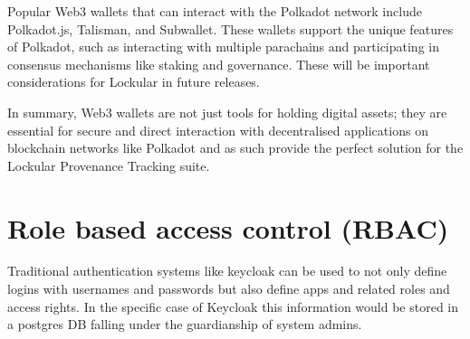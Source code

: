 \documentclass{tufte-handout}
\begin{document}
 Popular Web3 wallets that can interact with the Polkadot network include Polkadot.js, Talisman, and Subwallet. These wallets support the unique features of Polkadot, such as
 interacting with multiple parachains and participating in consensus mechanisms like staking and governance. These will be important considerations for Lockular in future releases.

 In summary, Web3 wallets are not just tools for holding digital assets; they are essential for secure and direct interaction with decentralised
 applications on blockchain networks like Polkadot and as such provide the perfect solution for the Lockular Provenance Tracking suite.

 \section{Role based access control (RBAC)}\label{sec:page-layout}
 Traditional authentication systems like keycloak can be used to not only define logins with usernames and passwords but also define apps and related roles and access rights. In the
 specific case of Keycloak this information would be stored in a postgres DB falling under the guardianship of system admins.
\end{document}

